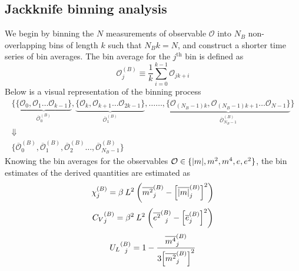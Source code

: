 \documentclass[../journal_main.tex]{subfiles}
\begin{document}
\subsection{Jackknife binning analysis}
We begin by binning the $N$ measurements of observable $\mathcal{O}$ into $N_B$ non-overlapping bins of length $k$ such that $N_B k = N$, and construct a shorter time series of bin averages. The bin average for the $j^\text{th}$ bin is defined as
\begin{equation}
    \mathcal{O}^{(B)}_j \equiv \frac{1}{k} \sum_{i = 0}^{k-1} \mathcal{O}_{jk+i} 
\end{equation}
Below is a visual representation of the binning process 
\begin{gather*}
    \{\underbrace{\{\mathcal{O}_0, \mathcal{O}_1 \ldots \mathcal{O}_{k-1}\}}_{\overline{\mathcal{O}}^{(B)}_0}, \underbrace{\{\mathcal{O}_{k}, \mathcal{O}_{k+1} \ldots \mathcal{O}_{2k-1}\}}_{\overline{\mathcal{O}}^{(B)}_1}, \ldots\ldots ,\underbrace{\{\mathcal{O}_{(N_B-1)k}, \mathcal{O}_{(N_B-1)k+1} \ldots \mathcal{O}_{N-1}\}}_{\overline{\mathcal{O}}^{(B)}_{N_B-1}}\} \\
    \Downarrow \\
    \{
        \overline{\mathcal{O}}^{(B)}_0, \overline{\mathcal{O}}^{(B)}_1, \overline{\mathcal{O}}^{(B)}_2 \ldots ,\overline{\mathcal{O}}^{(B)}_{N_B-1} 
    \}
\end{gather*}
Knowing the bin averages for the observables $\mathcal{O} \in \{\abs{m}, m^2, m^4, e, e^2 \}$, the bin estimates of the derived quantities are estimated as
\begin{equation}
    \chi^{(B)}_j = \beta \: L^2\:\qty(\overline{m^2}^{(B)}_j - \qty[\overline{|m|}^{(B)}_j]^2)
\end{equation}
\begin{equation}
    {C_V}^{(B)}_j = \beta ^2\: L^2 \:\qty(\overline{e^2}^{(B)}_{\:\:\:j} - \qty[\overline{e}^{(B)}_j]^2)
\end{equation}
\begin{equation}
    {U_L}^{(B)}_{\:\:\:j} = 1 - \frac{\overline{m^4}^{(B)}_j}{3\qty[\overline{m^2}^{(B)}_j]^2}
\end{equation}
\end{document}
